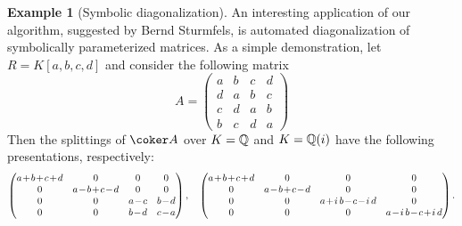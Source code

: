 \documentclass[12pt]{article}
\theoremstyle{theorem}
\numberwithin{thm}{section}
\theoremstyle{definition}
\newtheorem{exa}[thm]{Example}
\newcommand{\mahrud}[1]{{\color{ForestGreen} \sf $\blacklozenge$ Mahrud: [#1]}}
\begin{document}
\begin{exa}[Symbolic diagonalization]\label{example:QQ}
  An interesting application of our algorithm, suggested by Bernd Sturmfels,  is automated diagonalization of symbolically parameterized matrices. As a simple demonstration, let $R = K[a,b,c,d]$ and consider the following matrix
  \[ A = \begin{pmatrix}
    a&b&c&d\\
    d&a&b&c\\
    c&d&a&b\\
    b&c&d&a
  \end{pmatrix} \]
  Then the splittings of $\coker A$ over $K = \mathbb Q$ and $K = \mathbb Q(i)$ have the following presentations, respectively:
  \[\medmuskip1.5mu \begin{pmatrix}
    a+b+c+d&0&0&0\\
    0&a-b+c-d&0&0\\
    0&0&a-c&b-d\\
    0&0&b-d&c-a
  \end{pmatrix},
\quad
  \begin{pmatrix}
    a+b+c+d&0&0&0\\
    0&a-b+c-d&0&0\\
    0&0&a+i\,b-c-i\,d&0\\
    0&0&0&a-i\,b-c+i\,d
  \end{pmatrix}.
  \]
\end{exa}





\end{document}
